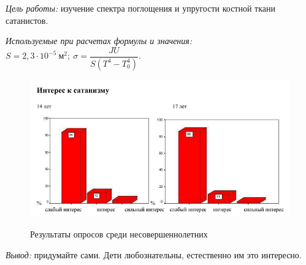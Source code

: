 \documentclass[pscyr,nonums]{hedlabwork}
\begin{document}
  \makeheader

  \emph{Цель работы:} изучение спектра поглощения и упругости костной ткани
    сатанистов.

  \emph{Используемые при расчетах формулы и значения:}
  \( S = 2,\!3\cdot10^{-5}~\text{м}^2; \ \sigma = \dfrac{JU}{S(T^4 - T_0^4)} \).

  \begin{figure}[h!]
    \center
    \includegraphics[width=.6\textwidth]{image} \\
    \caption{Результаты опросов среди несовершеннолетних}
  \end{figure}

  \emph{Вывод:} придумайте сами. Дети любознательны, естественно им это
    интересно.
\end{document}
